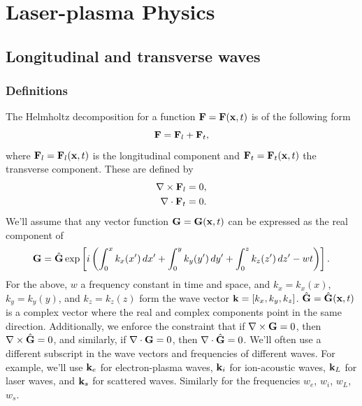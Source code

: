 \documentclass[a4paper,11pt]{report}
\begin{document}
\part{Laser-plasma Physics}

\chapter{Longitudinal and transverse waves}

\section{Definitions}
The Helmholtz decomposition for a function $\mathbf{F} = \mathbf{F}(\mathbf{x},t)$ is of the following form
\begin{equation}
    \mathbf{F} = \mathbf{F}_l + \mathbf{F}_t,
\end{equation}
where $\mathbf{F}_l = \mathbf{F}_l(\mathbf{x},t)$ is the longitudinal component and $\mathbf{F}_t = \mathbf{F}_t(\mathbf{x},t)$ the transverse component. These are defined by
\begin{align}
    \nabla \times \mathbf{F}_l &= 0, \label{eq:ltw_plasma_long_def}\\
    \nabla \cdot \mathbf{F}_t &= 0. \label{eq:ltw_plasma_tran_def}
\end{align}
We'll assume that any vector function $\mathbf{G} = \mathbf{G}(\mathbf{x},t)$ can be expressed as the real component of
\begin{equation}
    \label{eq:em_more_general_wave_form}
    \mathbf{G} = \hat{\mathbf{G}} \exp \left [ i \left ( \int_0^x k_x(x') \, dx' + \int_0^y k_y(y') \, dy' + \int_0^z k_z(z') \, dz'  - wt \right ) \right ].
\end{equation}
For the above, $w$ a frequency constant in time and space, and $k_x = k_x(x)$, $k_y = k_y(y)$, and $k_z = k_z(z)$ form the wave vector $\mathbf{k} = [k_x, k_y, k_z]$. $\hat{\mathbf{G}} = \hat{\mathbf{G}}(\mathbf{x},t)$ is a complex vector where the real and complex components point in the same direction. Additionally, we enforce the constraint that if $\nabla \times \mathbf{G} = 0$, then $\nabla \times \hat{\mathbf{G}} = 0$, and similarly, if $\nabla \cdot \mathbf{G} = 0$, then $\nabla \cdot \hat{\mathbf{G}} = 0$. We'll often use a different subscript in the wave vectors and frequencies of different waves. For example, we'll use $\mathbf{k}_e$ for electron-plasma waves, $\mathbf{k}_i$ for ion-acoustic waves, $\mathbf{k}_L$ for laser waves, and $\mathbf{k}_s$ for scattered waves. Similarly for the frequencies $w_e$, $w_i$, $w_L$, $w_s$.
\end{document}
